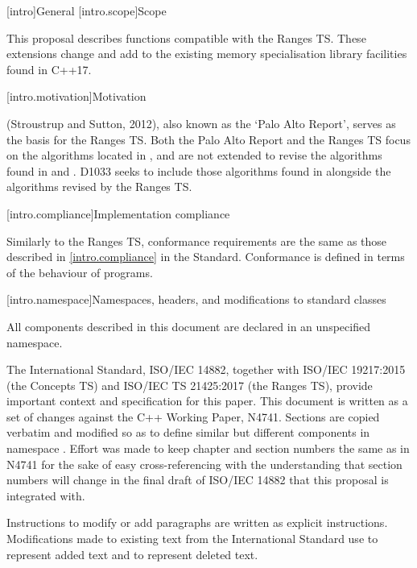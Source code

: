 [intro]{General}
[intro.scope]{Scope}

\pnum
This proposal describes functions compatible with the Ranges TS. These extensions change and add to
the existing memory specialisation library facilities found in C++17.

[intro.motivation]{Motivation}

\pnum
{} (Stroustrup and Sutton, 2012), also known as the
`Palo Alto Report', serves as the basis for the Ranges TS. Both the Palo Alto Report and the Ranges
TS focus on the algorithms located in , and are not extended to revise the
algorithms found in  and . D1033 seeks to include those algorithms
found in  alongside the algorithms revised by the Ranges TS.

[intro.compliance]{Implementation compliance}

\pnum
Similarly to the Ranges TS, conformance requirements are the same as those described in
\ref{intro.compliance} in the \Cpp Standard.
\enternote
Conformance is defined in terms of the behaviour of programs.
\exitnote

[intro.namespace]{Namespaces, headers, and modifications to standard classes}

\pnum
All components described in this document are declared in an unspecified namespace.


\pnum
The International Standard, ISO/IEC 14882, together with ISO/IEC 19217:2015 (the Concepts TS) and
ISO/IEC TS 21425:2017 (the Ranges TS), provide important context and specification for this paper.
This document is written as a set of changes against the C++ Working Paper, N4741. Sections are
copied verbatim and modified so as to define similar but different components in namespace .
Effort was made to keep chapter and section numbers the same as in N4741 for the sake of easy
cross-referencing with the understanding that section numbers will change in the final draft of
ISO/IEC 14882 that this proposal is integrated with.

\pnum
Instructions to modify or add paragraphs are written as explicit instructions. Modifications made
to existing text from the International Standard use  to represent added
text and  to represent deleted text.

